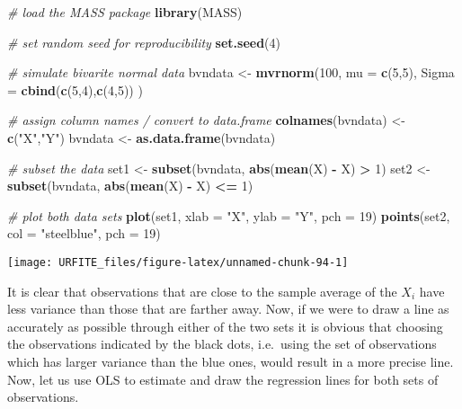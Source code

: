 \documentclass[]{book}
\newenvironment{Shaded}{\begin{snugshade}}{\end{snugshade}}
\newcommand{\KeywordTok}[1]{\textcolor[rgb]{0.13,0.29,0.53}{\textbf{#1}}}
\newcommand{\DataTypeTok}[1]{\textcolor[rgb]{0.13,0.29,0.53}{#1}}
\newcommand{\DecValTok}[1]{\textcolor[rgb]{0.00,0.00,0.81}{#1}}
\newcommand{\StringTok}[1]{\textcolor[rgb]{0.31,0.60,0.02}{#1}}
\newcommand{\CommentTok}[1]{\textcolor[rgb]{0.56,0.35,0.01}{\textit{#1}}}
\newcommand{\OperatorTok}[1]{\textcolor[rgb]{0.81,0.36,0.00}{\textbf{#1}}}
\newcommand{\NormalTok}[1]{#1}
\theoremstyle{definition}
\theoremstyle{definition}
\theoremstyle{definition}
\theoremstyle{remark}
\begin{document}
\begin{Shaded}
\begin{Highlighting}[]
\CommentTok{# load the MASS package}
\KeywordTok{library}\NormalTok{(MASS)}

\CommentTok{# set random seed for reproducibility}
\KeywordTok{set.seed}\NormalTok{(}\DecValTok{4}\NormalTok{)}

\CommentTok{# simulate bivarite normal data}
\NormalTok{bvndata <-}\StringTok{ }\KeywordTok{mvrnorm}\NormalTok{(}\DecValTok{100}\NormalTok{, }
                \DataTypeTok{mu =} \KeywordTok{c}\NormalTok{(}\DecValTok{5}\NormalTok{,}\DecValTok{5}\NormalTok{), }
                \DataTypeTok{Sigma =} \KeywordTok{cbind}\NormalTok{(}\KeywordTok{c}\NormalTok{(}\DecValTok{5}\NormalTok{,}\DecValTok{4}\NormalTok{),}\KeywordTok{c}\NormalTok{(}\DecValTok{4}\NormalTok{,}\DecValTok{5}\NormalTok{))}
\NormalTok{                ) }

\CommentTok{# assign column names / convert to data.frame}
\KeywordTok{colnames}\NormalTok{(bvndata) <-}\StringTok{ }\KeywordTok{c}\NormalTok{(}\StringTok{"X"}\NormalTok{,}\StringTok{"Y"}\NormalTok{)}
\NormalTok{bvndata <-}\StringTok{ }\KeywordTok{as.data.frame}\NormalTok{(bvndata)}

\CommentTok{# subset the data}
\NormalTok{set1 <-}\StringTok{ }\KeywordTok{subset}\NormalTok{(bvndata, }\KeywordTok{abs}\NormalTok{(}\KeywordTok{mean}\NormalTok{(X) }\OperatorTok{-}\StringTok{ }\NormalTok{X) }\OperatorTok{>}\StringTok{ }\DecValTok{1}\NormalTok{)}
\NormalTok{set2 <-}\StringTok{ }\KeywordTok{subset}\NormalTok{(bvndata, }\KeywordTok{abs}\NormalTok{(}\KeywordTok{mean}\NormalTok{(X) }\OperatorTok{-}\StringTok{ }\NormalTok{X) }\OperatorTok{<=}\StringTok{ }\DecValTok{1}\NormalTok{)}

\CommentTok{# plot both data sets}
\KeywordTok{plot}\NormalTok{(set1, }\DataTypeTok{xlab =} \StringTok{"X"}\NormalTok{, }\DataTypeTok{ylab =} \StringTok{"Y"}\NormalTok{, }\DataTypeTok{pch =} \DecValTok{19}\NormalTok{)}
\KeywordTok{points}\NormalTok{(set2, }\DataTypeTok{col =} \StringTok{"steelblue"}\NormalTok{, }\DataTypeTok{pch =} \DecValTok{19}\NormalTok{)}
\end{Highlighting}
\end{Shaded}

\begin{center}\texttt{[image: URFITE\_files/figure-latex/unnamed-chunk-94-1]} \end{center}

It is clear that observations that are close to the sample average of
the \(X_i\) have less variance than those that are farther away. Now, if
we were to draw a line as accurately as possible through either of the
two sets it is obvious that choosing the observations indicated by the
black dots, i.e.~using the set of observations which has larger variance
than the blue ones, would result in a more precise line. Now, let us use
OLS to estimate and draw the regression lines for both sets of
observations.
\end{document}
